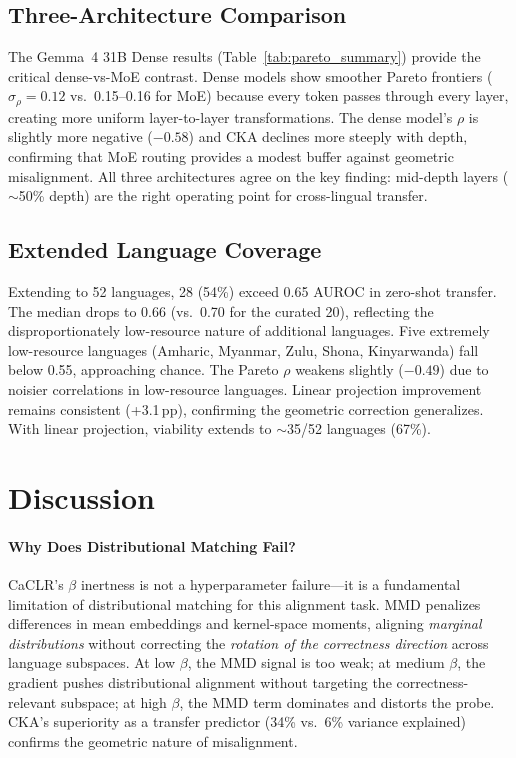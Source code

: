 \documentclass[11pt,a4paper]{article}
\begin{document}
\subsection{Three-Architecture Comparison}
\label{sec:arch}

The Gemma~4 31B Dense results (Table~\ref{tab:pareto_summary}) provide the critical dense-vs-MoE contrast. Dense models show smoother Pareto frontiers ($\sigma_\rho = 0.12$ vs.\ 0.15--0.16 for MoE) because every token passes through every layer, creating more uniform layer-to-layer transformations. The dense model's $\rho$ is slightly more negative ($-0.58$) and CKA declines more steeply with depth, confirming that MoE routing provides a modest buffer against geometric misalignment. All three architectures agree on the key finding: mid-depth layers ($\sim$50\% depth) are the right operating point for cross-lingual transfer.

\subsection{Extended Language Coverage}
\label{sec:extended}

Extending to 52 languages, 28 (54\%) exceed 0.65 AUROC in zero-shot transfer. The median drops to 0.66 (vs.\ 0.70 for the curated 20), reflecting the disproportionately low-resource nature of additional languages. Five extremely low-resource languages (Amharic, Myanmar, Zulu, Shona, Kinyarwanda) fall below 0.55, approaching chance. The Pareto $\rho$ weakens slightly ($-0.49$) due to noisier correlations in low-resource languages. Linear projection improvement remains consistent (+3.1\,pp), confirming the geometric correction generalizes. With linear projection, viability extends to $\sim$35/52 languages (67\%).

\section{Discussion}
\label{sec:discussion}

\paragraph{Why Does Distributional Matching Fail?}
CaCLR's $\beta$ inertness is not a hyperparameter failure---it is a fundamental limitation of distributional matching for this alignment task. MMD penalizes differences in mean embeddings and kernel-space moments, aligning \emph{marginal distributions} without correcting the \emph{rotation of the correctness direction} across language subspaces. At low $\beta$, the MMD signal is too weak; at medium $\beta$, the gradient pushes distributional alignment without targeting the correctness-relevant subspace; at high $\beta$, the MMD term dominates and distorts the probe. CKA's superiority as a transfer predictor (34\% vs.\ 6\% variance explained) confirms the geometric nature of misalignment.
\end{document}
